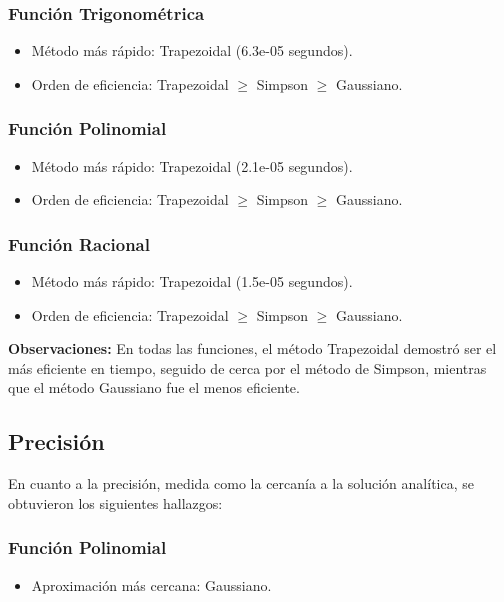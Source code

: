 \documentclass[a4paper]{article}
\begin{document}
   \subsubsection{Función Trigonométrica}
    \begin{itemize}
        \item Método más rápido: Trapezoidal (6.3e-05 segundos).
        \item Orden de eficiencia: Trapezoidal $\geq$ Simpson $\geq$ Gaussiano.
    \end{itemize}
    
    \subsubsection{Función Polinomial}
    \begin{itemize}
        \item Método más rápido: Trapezoidal (2.1e-05 segundos).
        \item Orden de eficiencia: Trapezoidal $\geq$ Simpson $\geq$ Gaussiano.
    \end{itemize}
    
    \subsubsection{Función Racional}
    \begin{itemize}
        \item Método más rápido: Trapezoidal (1.5e-05 segundos).
        \item Orden de eficiencia: Trapezoidal $\geq$ Simpson $\geq$ Gaussiano.
    \end{itemize}

    
    \textbf{Observaciones:}
    En todas las funciones, el método Trapezoidal demostró ser el más eficiente en tiempo, seguido de cerca por el 
    método de Simpson, mientras que el método Gaussiano fue el menos eficiente.
    
    \subsection{Precisión}
    
    En cuanto a la precisión, medida como la cercanía a la solución analítica, se obtuvieron los siguientes hallazgos:
    
    \subsubsection{Función Polinomial}
    \begin{itemize}
        \item Aproximación más cercana: Gaussiano.
    \end{itemize}
    
\end{document}
